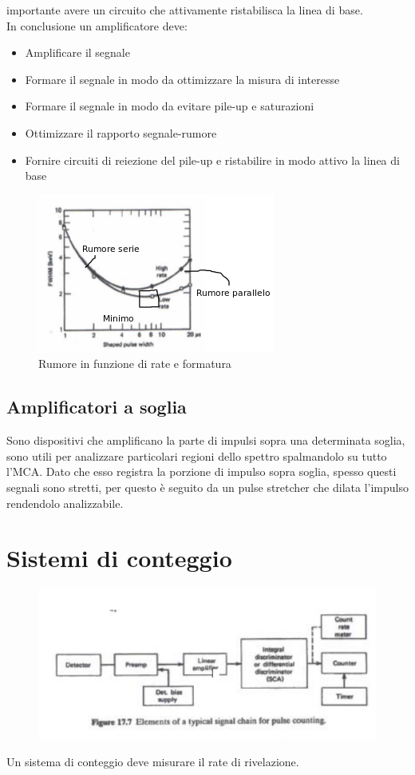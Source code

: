 importante avere un circuito che attivamente ristabilisca la linea di base.\\
In conclusione un amplificatore deve:
\begin{itemize}
\item Amplificare il segnale
\item Formare il segnale in modo da ottimizzare la misura di interesse
\item Formare il segnale in modo da evitare pile-up e saturazioni
\item Ottimizzare il rapporto segnale-rumore
\item Fornire circuiti di reiezione del pile-up e ristabilire in modo attivo la linea di base
\end{itemize}
\begin{figure}[htbp]
\begin{center}
\includegraphics[scale=1]{./Immagini/RumoreSerieParallelo.png}
\caption{Rumore in funzione di rate e formatura}
\label{fig:RumoreSerieParallelo}
\end{center}
\end{figure}
\subsection{Amplificatori a soglia}
Sono dispositivi che amplificano la parte di impulsi sopra una determinata soglia, sono utili per analizzare particolari regioni dello spettro spalmandolo su tutto l'MCA.
Dato che esso registra la porzione di impulso sopra soglia, spesso questi segnali sono stretti, per questo \`e seguito da un pulse stretcher che dilata l'impulso
rendendolo analizzabile.
\section{Sistemi di conteggio}
\begin{figure}[htb]
\begin{center}
\includegraphics[scale=0.7]{./Immagini/CatenaConteggio.png}
\label{fig:catenaConteggio}
\end{center}
\end{figure}
Un sistema di conteggio deve misurare il rate di rivelazione.
